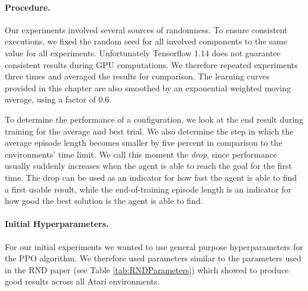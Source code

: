 \paragraph{Procedure.}
Our experiments involved several sources of randomness. To ensure consistent executions, we fixed the random seed for all involved components to the same value for all experiments. Unfortunately Tensorflow 1.14 does not guarantee consistent results during GPU computations. We therefore repeated experiments three times and averaged the results for comparison. The learning curves provided in this chapter are also smoothed by an exponential weighted moving average, using a factor of $0.6$.

To determine the performance of a configuration, we look at the end result during training for the average and best trial. We also determine the step in which the average episode length becomes smaller by five percent in comparison to the environments' time limit. We call this moment the \textit{drop}, since performance usually suddenly increases when the agent is able to reach the goal for the first time. The drop can be used as an indicator for how fast the agent is able to find a first usable result, while the end-of-training episode length is an indicator for how good the best solution is the agent is able to find. 

\paragraph{Initial Hyperparameters.}
For our initial experiments we wanted to use general purpose hyperparameters for the PPO algorithm. We therefore used parameters similar to the parameters used in the RND paper \cite{burda2018exploration} (see Table \ref{tab:RNDParameters}) which showed to produce good results across all Atari environments. 


